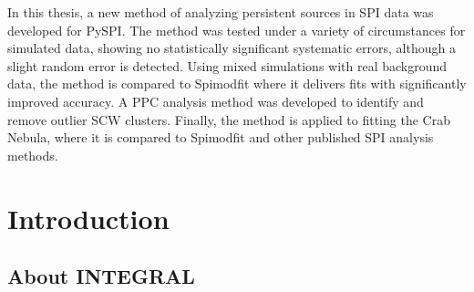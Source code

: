 \documentclass{report}
\begin{document}
\normalsize
In this thesis, a new method of analyzing persistent sources in SPI data was developed for PySPI. The method was tested under a variety of circumstances for simulated data, showing no statistically significant systematic errors, although a slight random error is detected. Using mixed simulations with real background data, the method is compared to Spimodfit where it delivers fits with significantly improved accuracy. A PPC analysis method was developed to identify and remove outlier SCW clusters. Finally, the method is applied to fitting the Crab Nebula, where it is compared to Spimodfit and other published SPI analysis methods.

\tableofcontents

\pagebreak





\chapter{Introduction}
\label{Introduction}
\section{About INTEGRAL}
\end{document}
